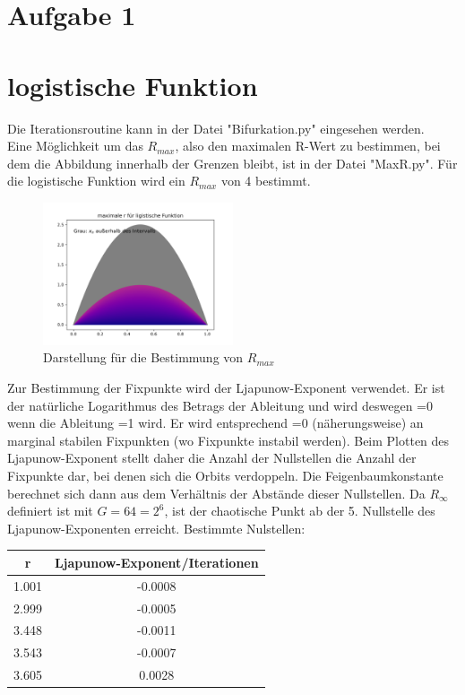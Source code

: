 \section*{Aufgabe 1}
\section{logistische Funktion}
Die Iterationsroutine kann in der Datei "Bifurkation.py" eingesehen werden. \\
Eine Möglichkeit um das $R_{max}$, also den maximalen R-Wert zu bestimmen, bei dem die Abbildung innerhalb der Grenzen bleibt, ist in der Datei "MaxR.py". Für die logistische Funktion wird ein $R_{max}$ von 4 bestimmt. \\
\begin{figure} [h]
	\centering
	\includegraphics[width=0.5\textwidth]{Aufgabe1/logisticMaxR.png}
	\caption{Darstellung für die Bestimmung von $R_{max}$}
\end{figure}
Zur Bestimmung der Fixpunkte wird der Ljapunow-Exponent verwendet. Er ist der natürliche Logarithmus des Betrags der Ableitung und wird deswegen =0 wenn die Ableitung =1 wird. Er wird entsprechend =0 (näherungsweise) an marginal stabilen Fixpunkten (wo Fixpunkte instabil werden). Beim Plotten des Ljapunow-Exponent stellt daher die Anzahl der Nullstellen die Anzahl der Fixpunkte dar, bei denen sich die Orbits verdoppeln. Die Feigenbaumkonstante berechnet sich dann aus dem Verhältnis der Abstände dieser Nullstellen. Da $R_{\infty}$ definiert ist mit $G=64=2^{6}$, ist der chaotische Punkt ab der 5. Nullstelle des Ljapunow-Exponenten erreicht. 
Bestimmte Nulstellen:\\
\begin{center}
\begin{tabular}{cc}
\toprule
r & Ljapunow-Exponent/Iterationen \\
\midrule
1.001 & -0.0008\\
2.999 & -0.0005\\
3.448 & -0.0011\\
3.543 & -0.0007\\
3.605 & 0.0028\\
\bottomrule
\end{tabular}
\end{center}
